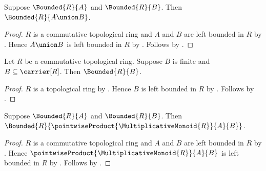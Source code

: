 \begin{corollary}\label{bounded_binary_union}
    Suppose $\Bounded{R}{A}$ and $\Bounded{R}{B}$.
    Then $\Bounded{R}{A\union B}$.
\end{corollary}
\begin{proof}
    $R$ is a commutative topological ring and
        $A$ and $B$ are left bounded in $R$ by
        .
    Hence $A\union B$ is left bounded in $R$ by
        .
    Follows by .
\end{proof}

\begin{corollary}\label{finite_subset_bounded}
    Let $R$ be a commutative topological ring.
    Suppose $B$ is finite and $B\subseteq\carrier[R]$.
    Then $\Bounded{R}{B}$.
\end{corollary}
\begin{proof}
    $R$ is a topological ring by
        .
    Hence $B$ is left bounded in $R$ by .
    Follows by .
\end{proof}

\begin{corollary}\label{bounded_pointwise_product}
    Suppose $\Bounded{R}{A}$ and $\Bounded{R}{B}$.
    Then $\Bounded{R}{
        \pointwiseProduct{\MultiplicativeMonoid{R}}{A}{B}}$.
\end{corollary}
\begin{proof}
    $R$ is a commutative topological ring and
        $A$ and $B$ are left bounded in $R$ by
        .
    Hence $\pointwiseProduct{\MultiplicativeMonoid{R}}{A}{B}$ is left
        bounded in $R$ by .
    Follows by .
\end{proof}

